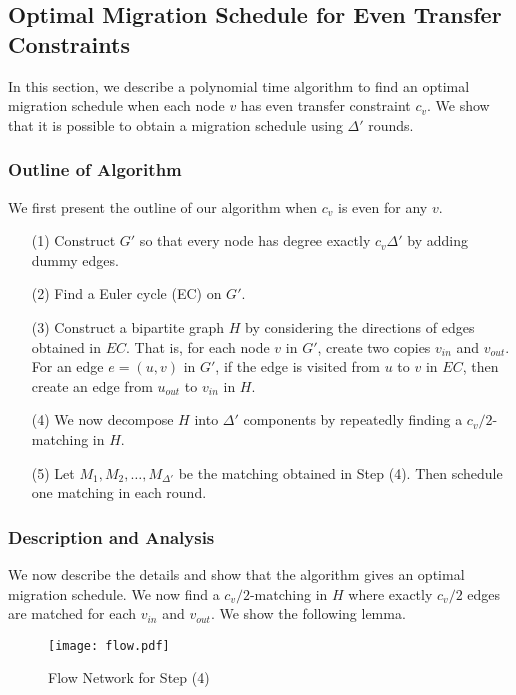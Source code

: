 \documentclass[titlepage, 11pt]{article}
\begin{document}
\subsection{Optimal Migration Schedule for Even Transfer Constraints}

In this section, we describe a polynomial time algorithm to find an optimal migration
schedule when each node $v$ has even transfer constraint $c_v$. We show that it is possible to obtain a migration schedule using $\Delta'$ rounds.

\subsubsection{Outline of Algorithm}
We first present the outline of our algorithm when $c_v$ is even for any $v$.

\begin{enumerate}
\item[(1)] Construct $G'$ so that every node has degree exactly $c_v \Delta'$   
by adding dummy edges.
\item[(2)] Find a Euler cycle (EC) on $G'$. 
\item[(3)] Construct a bipartite graph $H$ by considering the directions of edges
obtained in $EC$. That is, for each node $v$ in $G'$, create two copies $v_{in}$
and $v_{out}$. For an edge $e = (u, v)$ in $G'$, if the edge is visited
from $u$ to $v$ in $EC$, then create an edge from $u_{out}$ to $v_{in}$ in $H$.
\item[(4)] We now decompose $H$ into $\Delta'$ components
by repeatedly finding a $c_v/2$-matching in $H$. 
\item[(5)] Let $M_1, M_2, \dots, M_{\Delta'}$ be the matching
obtained in Step (4). Then schedule one matching in each round.
\end{enumerate}


\subsubsection{Description and Analysis}\label{sec:detail_even}
We now describe the details and show that
the algorithm gives an optimal migration schedule.
\vspace{0.1in}
We now find a $c_v/2$-matching in $H$  where exactly $c_v/2$ edges are matched for each $v_{in}$
and $v_{out}$. We show the following lemma.
\begin{figure}[h]
\centering
\texttt{[image: flow.pdf]}
\caption{Flow Network for Step (4)}
\label{fig:flow}
\end{figure}
\vspace{0.1in}
\end{document}
